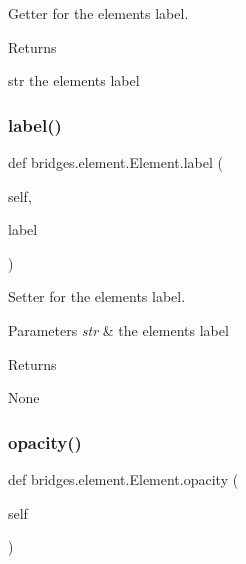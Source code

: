 Getter for the element\textquotesingle{}s label. 

\begin{DoxyReturn}{Returns}


str the element\textquotesingle{}s label 
\end{DoxyReturn}
\mbox{\label{classbridges_1_1element_1_1_element_a29dd33558e94464186658d2baad1d6c9}} 
\subsubsection{\texorpdfstring{label()}{label()}\hspace{0.1cm}{\footnotesize\ttfamily [2/2]}}
{\footnotesize\ttfamily def bridges.\+element.\+Element.\+label (\begin{DoxyParamCaption}\item[{}]{self,  }\item[{}]{label }\end{DoxyParamCaption})}



Setter for the element\textquotesingle{}s label. 


\begin{DoxyParams}{Parameters}
{\em str} & the element\textquotesingle{}s label \\
\hline
\end{DoxyParams}
\begin{DoxyReturn}{Returns}


None 
\end{DoxyReturn}
\mbox{\label{classbridges_1_1element_1_1_element_a31ce56c32bd400a2d8d0e7e146c4b5f3}} 
\subsubsection{\texorpdfstring{opacity()}{opacity()}\hspace{0.1cm}{\footnotesize\ttfamily [1/2]}}
{\footnotesize\ttfamily def bridges.\+element.\+Element.\+opacity (\begin{DoxyParamCaption}\item[{}]{self }\end{DoxyParamCaption})}




